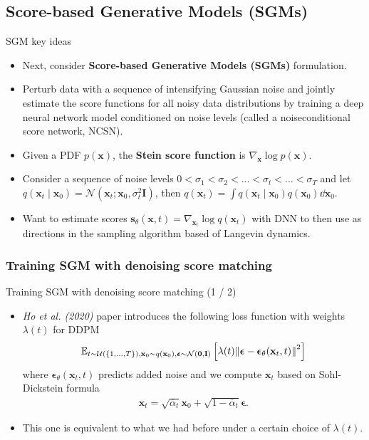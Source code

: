 \documentclass{beamer}
\begin{document}
\subsection{Score-based Generative Models (SGMs)}
\begin{frame}{SGM key ideas}
\begin{itemize}
  \item Next, consider \textbf{Score-based Generative Models (SGMs)} formulation. 
  \item Perturb data with a sequence of intensifying Gaussian noise and jointly estimate the score functions for all noisy data distributions by training a deep neural network model conditioned on noise levels (called a noiseconditional score network, NCSN).
  \item Given a PDF $p(\mathbf{x})$, the \textbf{Stein score function} is $\nabla_\mathbf{x} \log p(\mathbf{x})$.
  \item Consider a sequence of noise levels $0 < \sigma_1 < \sigma_2 < ... < \sigma_t < ... < \sigma_T$ and let $q(\mathbf{x}_t \mid \mathbf{x}_{0}) = \mathcal{N}(\mathbf{x}_t ; \mathbf{x}_0, \sigma_t^2 \mathbf{I})$, then $q(\mathbf{x}_t) = \int q(\mathbf{x}_t \mid \mathbf{x}_{0}) q(\mathbf{x}_0) \dd \mathbf{x}_0$.
  \item Want to estimate scores $\mathbf{s}_\theta (\mathbf{x}, t) = \nabla_{\mathbf{x}_t}\log q(\mathbf{x}_t)$ with DNN to then use as directions in the sampling algorithm based of Langevin dynamics.
\end{itemize}
\end{frame}

\subsubsection{Training SGM with denoising score matching}
\begin{frame}{Training SGM with denoising score matching (1 / 2)}
  \begin{itemize}
    \item \textit{Ho et al. (2020)} paper introduces the following loss function with weights $\lambda(t)$ for DDPM
    \begin{align}
      \mathbb{E}_{t \sim \mathcal{U}(\{1,...,T\}), \mathbf{x}_0 \sim q(\mathbf{x}_0), \boldsymbol{\epsilon}\sim \mathcal{N}(\mathbf{0}, \mathbf{I})}\left[\lambda(t) \norm{\boldsymbol{\epsilon}-\boldsymbol{\epsilon}_\theta(\mathbf{x}_t, t)}^2\right]
    \end{align}
    where $\boldsymbol{\epsilon}_\theta(\mathbf{x}_t, t)$ predicts added noise and we compute $\mathbf{x}_t$ based on Sohl-Dickstein formula 
    \begin{align}
      \mathbf{x}_t = \sqrt{\overline{\alpha}_t} \mathbf{x}_0 + \sqrt{1 - \overline{\alpha}_t}\boldsymbol{\epsilon}.
    \end{align} 
    \item This one is equivalent to what we had before under a certain choice of $\lambda(t)$. 
  \end{itemize}
\end{frame}
\end{document}
